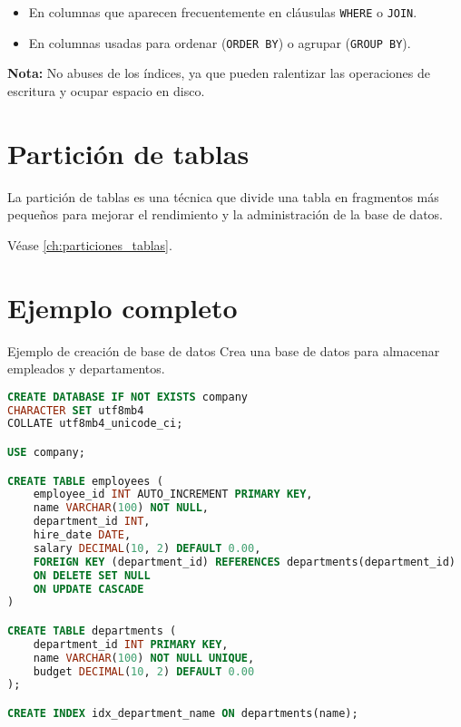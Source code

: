 \begin{itemize}
    \item En columnas que aparecen frecuentemente en cláusulas \texttt{WHERE} o \texttt{JOIN}.
    \item En columnas usadas para ordenar (\texttt{ORDER BY}) o agrupar (\texttt{GROUP BY}).
\end{itemize}

\textbf{Nota:} No abuses de los índices, ya que pueden ralentizar
las operaciones de escritura y ocupar espacio en disco.

\section{Partición de tablas}

La partición de tablas es una técnica que divide una tabla
en fragmentos más pequeños para mejorar el rendimiento y
la administración de la base de datos.

Véase \ref{ch:particiones_tablas}.

\section{Ejemplo completo}

\begin{examplebox}{Ejemplo de creación de base de datos}
    Crea una base de datos para almacenar empleados y departamentos.
\end{examplebox}

\vspace{10pt}

\begin{lstlisting}[language=SQL]
CREATE DATABASE IF NOT EXISTS company
CHARACTER SET utf8mb4
COLLATE utf8mb4_unicode_ci;

USE company;

CREATE TABLE employees (
    employee_id INT AUTO_INCREMENT PRIMARY KEY,
    name VARCHAR(100) NOT NULL,
    department_id INT,
    hire_date DATE,
    salary DECIMAL(10, 2) DEFAULT 0.00,
    FOREIGN KEY (department_id) REFERENCES departments(department_id)
    ON DELETE SET NULL
    ON UPDATE CASCADE
)

CREATE TABLE departments (
    department_id INT PRIMARY KEY,
    name VARCHAR(100) NOT NULL UNIQUE,
    budget DECIMAL(10, 2) DEFAULT 0.00
);

CREATE INDEX idx_department_name ON departments(name);
\end{lstlisting}